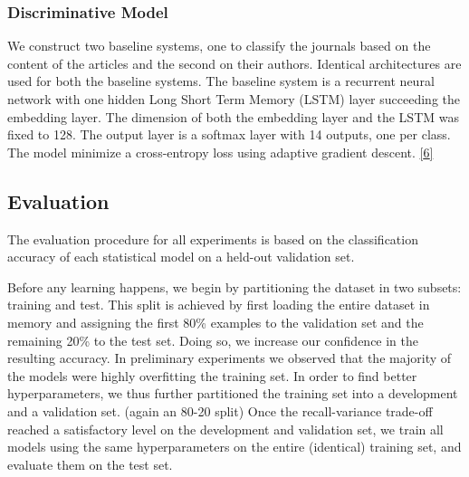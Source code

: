 \documentclass[12pt]{article}
\begin{document}
\subsubsection{Discriminative Model}

We construct two baseline systems, one to classify the journals based on the
content of the articles and the second on their authors. Identical architectures are used for both the baseline
systems. The baseline system is a recurrent neural network with one hidden Long
Short Term Memory (LSTM) layer succeeding the embedding layer. The dimension of
both the embedding layer and the LSTM was fixed to 128. The output layer is a
softmax layer with 14 outputs, one per class. The model minimize a cross-entropy loss using adaptive gradient descent. \href{References}{{[}6{]}}




\subsection{Evaluation}
The evaluation procedure for all experiments is based on the classification accuracy of each statistical model on a held-out validation set.

Before any learning happens, we begin by partitioning the dataset in two subsets: training and test. This split is achieved by first loading the entire dataset in memory and assigning the first 80\% examples to the validation set and the remaining 20\% to the test set. Doing so, we increase our confidence in the resulting accuracy. In preliminary experiments we observed that the majority of the models were highly overfitting the training set. In order to find better hyperparameters, we thus further partitioned the training set into a development and a validation set. (again an 80-20 split) Once the recall-variance trade-off reached a satisfactory level on the development and validation set, we train all models using the same hyperparameters on the entire (identical) training set, and evaluate them on the test set.
\end{document}
